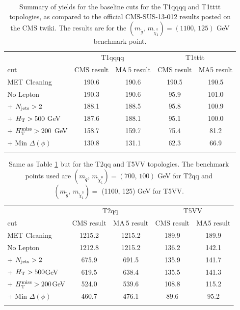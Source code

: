 \begin{table}[!t]
\begin{center}
\caption{Summary of yields for the baseline cuts for the T1qqqq and T1tttt topologies, as compared to the official CMS-SUS-13-012 results posted on the CMS twiki. The results are for the $(m_{\tilde g},\,m_{\tilde\chi^0_1})=(1100,\,125)$ GeV benchmark point.\label{table:CutFlowT1qqqq}}
\begin{tabular}{ l ||c|c||c|c}
\hline\noalign{\smallskip}
& \multicolumn{2}{|c||}{T1qqqq} & \multicolumn{2}{c}{T1tttt}  \\
cut & CMS result & {\sc MA}\,5 result & CMS result & {\sc MA}5 result \\ 
\hline\noalign{\smallskip}
MET Cleaning & 190.6 & 190.6 & 190.5  & 190.5    \\ 
No Lepton   & 190.3 & 190.6  &  95.9 & 101.0 \\
+ $N_{\rm jets}>2$        & 188.1 & 188.5  & 95.8 & 100.9  \\
+ $H_{\rm T} > 500$ GeV   & 187.6 & 188.1  & 95.1  &  100.0\\
+ $H_{\text{T}}^{\rm miss} >200$ GeV   &158.7  &  159.7 & 75.4 & 81.2  \\
+ Min $\Delta(\phi)$ & 130.8 & 131.1 &62.3 & 66.9 \\
\noalign{\smallskip}\hline
\end{tabular}
\end{center}
\end{table}

\begin{table}[!t]
\caption{Same as Table \ref{table:CutFlowT1qqqq}  but for the T2qq and T5VV topologies. 
The benchmark points used are $(m_{\tilde
  q},\,m_{\tilde\chi^0_1})=(700,\,100)$ GeV for T2qq and $(m_{\tilde
  g},\,m_{\tilde\chi^0_1})=$ (1100, 125) GeV for T5VV.
\label{table:CutFlowT5VV}}
\begin{center}
\begin{tabular}{ l ||c|c||c|c}
\hline\noalign{\smallskip}
& \multicolumn{2}{|c||}{T2qq} & \multicolumn{2}{c}{T5VV}  \\
cut & CMS result & {\sc MA}\,5 result & CMS result & {\sc MA}5 result \\ 
\hline\noalign{\smallskip}
MET Cleaning & 1215.2 & 1215.2 &  189.9 & 189.9     \\ 
No Lepton   & 1212.8 & 1215.2  & 136.2  & 142.1  \\
+ $N_{\rm jets}>2$        & 675.9 & 691.5  &135.9  & 141.7  \\
+ $H_{\rm T} > 500$GeV   & 619.5 & 638.4   & 135.5  & 141.3 \\
+ $H_{\text{T}}^{\rm miss} >200$GeV   & 524.0 & 539.6   & 108.8 & 115.2   \\
+ Min $\Delta(\phi)$ & 460.7 & 476.1  & 89.6 & 95.2 \\
\noalign{\smallskip}\hline
\end{tabular}
\end{center}
\end{table}

